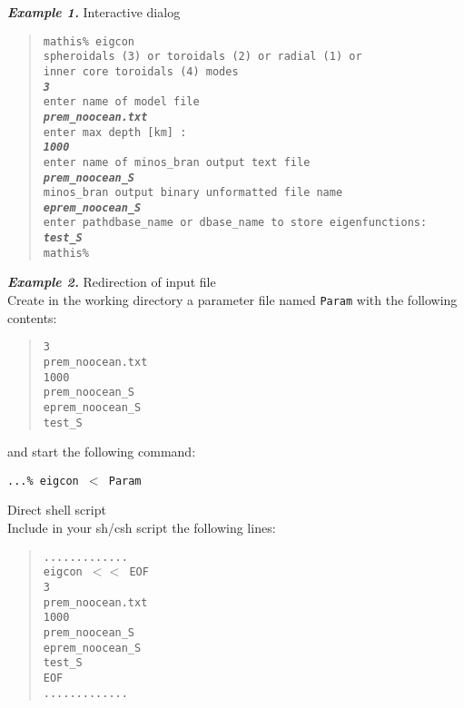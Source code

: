 {\bf\emph{Example 1.}} Interactive dialog
\begin{quote}
\texttt{mathis\% eigcon \\
spheroidals (3) or toroidals (2) or radial (1) or \\
inner core toroidals (4) modes \\
{\bf \emph{3}} \\
enter name of model file \\
{\bf \emph{prem\_noocean.txt}} \\
enter max depth [km] : \\
{\bf \emph{1000}} \\
enter name of minos\_bran output text file \\
{\bf \emph{prem\_noocean\_S}} \\
minos\_bran output binary unformatted file name \\
{\bf \emph{eprem\_noocean\_S}} \\
enter path\/dbase\_name or dbase\_name to store eigenfunctions: \\
{\bf \emph{test\_S}} \\
mathis\%  }
\end{quote}

{\bf\emph{Example 2.}} Redirection of input file \\
Create in the working directory a parameter file named {\tt Param} with
the following contents:
\begin{quote}
\texttt{3 \\
prem\_noocean.txt \\
1000 \\
prem\_noocean\_S \\
eprem\_noocean\_S \\
test\_S }
\end{quote}
and start the following command:

\texttt{...\% eigcon $<$ Param}

 Direct shell script \\
Include in your sh/csh script the following lines:
\begin{quote}
\texttt{............. \\
eigcon $<<$ EOF \\
3 \\
prem\_noocean.txt \\
1000 \\
prem\_noocean\_S \\
eprem\_noocean\_S \\
test\_S \\
EOF \\
............. }
\end{quote}
\newpage
%
%
